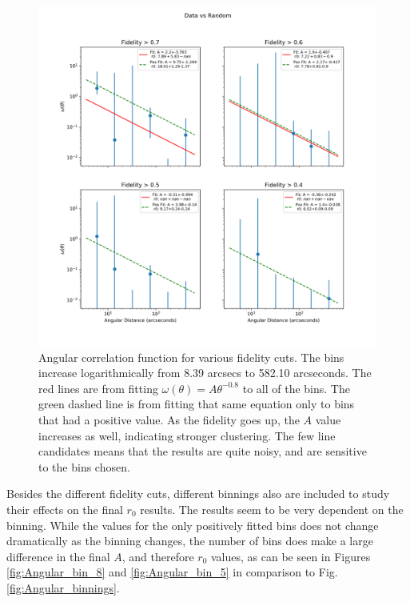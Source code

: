 \begin{figure}[tbp]
\centering \includegraphics[width=120mm]{Log_4Panel_Data_Vs_Random_bin6_NFalse_Num10000.png}
\caption{Angular correlation function for various fidelity cuts. The bins increase logarithmically from 8.39 arcsecs to 582.10 arcseconds. The red lines are from fitting $\omega(\theta) = A\theta^{-0.8} $ to all of the bins. The green dashed line is from fitting that same equation only to bins that had a positive value. As the fidelity goes up, the $A$ value increases as well, indicating stronger clustering. The few line candidates means that the results are quite noisy, and are sensitive to the bins chosen.}
\label{fig:Angular_correlation}
\end{figure}

Besides the different fidelity cuts, different binnings also are included to study their effects on the final $r_0$ results. The results seem to be very dependent on the binning. While the values for the only positively fitted bins does not change dramatically as the binning changes, the number of bins does make a large difference in the final $A$, and therefore $r_0$ values, as can be seen in Figures \ref{fig:Angular_bin_8} and \ref{fig:Angular_bin_5} in comparison to Fig. \ref{fig:Angular_binnings}.

